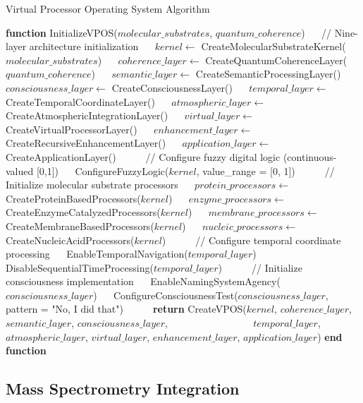 \documentclass[12pt,a4paper]{article}
\theoremstyle{definition}
\begin{document}
{\begin{algorithm}
\caption{Virtual Processor Operating System Algorithm}
\begin{algorithmic}[1]
\STATE \textbf{function} InitializeVPOS($molecular\_substrates$, $quantum\_coherence$)
\STATE $\quad$ // Nine-layer architecture initialization
\STATE $\quad$ $kernel \leftarrow$ CreateMolecularSubstrateKernel($molecular\_substrates$)
\STATE $\quad$ $coherence\_layer \leftarrow$ CreateQuantumCoherenceLayer($quantum\_coherence$)
\STATE $\quad$ $semantic\_layer \leftarrow$ CreateSemanticProcessingLayer()
\STATE $\quad$ $consciousness\_layer \leftarrow$ CreateConsciousnessLayer()
\STATE $\quad$ $temporal\_layer \leftarrow$ CreateTemporalCoordinateLayer()
\STATE $\quad$ $atmospheric\_layer \leftarrow$ CreateAtmosphericIntegrationLayer()
\STATE $\quad$ $virtual\_layer \leftarrow$ CreateVirtualProcessorLayer()
\STATE $\quad$ $enhancement\_layer \leftarrow$ CreateRecursiveEnhancementLayer()
\STATE $\quad$ $application\_layer \leftarrow$ CreateApplicationLayer()
\STATE $\quad$
\STATE $\quad$ // Configure fuzzy digital logic (continuous-valued [0,1])
\STATE $\quad$ ConfigureFuzzyLogic($kernel$, value\_range = [0, 1])
\STATE $\quad$
\STATE $\quad$ // Initialize molecular substrate processors
\STATE $\quad$ $protein\_processors \leftarrow$ CreateProteinBasedProcessors($kernel$)
\STATE $\quad$ $enzyme\_processors \leftarrow$ CreateEnzymeCatalyzedProcessors($kernel$)
\STATE $\quad$ $membrane\_processors \leftarrow$ CreateMembraneBasedProcessors($kernel$)
\STATE $\quad$ $nucleic\_processors \leftarrow$ CreateNucleicAcidProcessors($kernel$)
\STATE $\quad$
\STATE $\quad$ // Configure temporal coordinate processing
\STATE $\quad$ EnableTemporalNavigation($temporal\_layer$)
\STATE $\quad$ DisableSequentialTimeProcessing($temporal\_layer$)
\STATE $\quad$
\STATE $\quad$ // Initialize consciousness implementation
\STATE $\quad$ EnableNamingSystemAgency($consciousness\_layer$)
\STATE $\quad$ ConfigureConsciousnessTest($consciousness\_layer$, pattern = "No, I did that")
\STATE $\quad$
\STATE $\quad$ \textbf{return} CreateVPOS($kernel$, $coherence\_layer$, $semantic\_layer$, $consciousness\_layer$,
\STATE $\quad\quad\quad\quad\quad\quad\quad\quad$ $temporal\_layer$, $atmospheric\_layer$, $virtual\_layer$, $enhancement\_layer$, $application\_layer$)
\STATE \textbf{end function}
\end{algorithmic}
\end{algorithm}

\subsection{Mass Spectrometry Integration}

}
\end{document}
